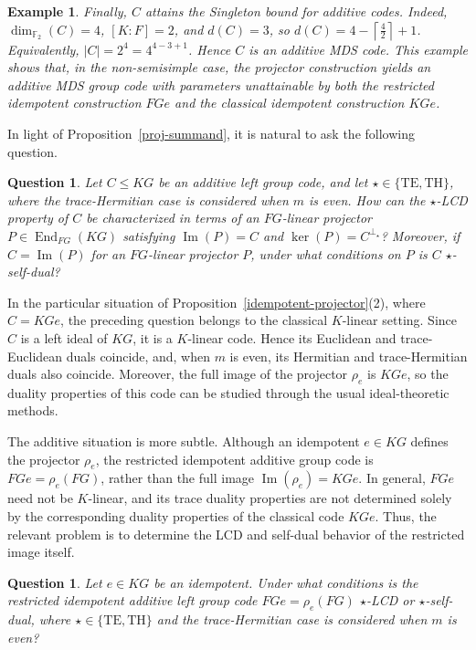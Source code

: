 \documentclass[11pt]{article}
\newtheorem{example}[theorem]{Example}
\newtheorem{question}[theorem]{Question}}
\begin{document}
\begin{example}
Finally, $C$ attains the Singleton bound for additive codes. Indeed,
$\dim_{\mathbb{F}_2}(C)=4$, $[K:F]=2$, and $d(C)=3$, so
$d(C)=4-\left\lceil\frac{4}{2}\right\rceil+1$. Equivalently,
$|C|=2^4=4^{4-3+1}$. Hence $C$ is an additive MDS code. This example shows
that, in the non-semisimple case, the projector construction yields an
additive MDS group code with parameters unattainable by both the restricted
idempotent construction $FGe$ and the classical idempotent construction
$KGe$.
\end{example}



In light of Proposition~\ref{proj-summand}, it is natural to ask the following question.


\begin{question}\label{question-1}
Let $C\leq KG$ be an additive left group code, and let
$\star\in\{\mathrm{TE},\mathrm{TH}\}$, where the trace-Hermitian case is
considered when $m$ is even. How can the $\star$-LCD property of $C$ be
characterized in terms of an $FG$-linear projector
$P\in\operatorname{End}_{FG}(KG)$ satisfying
$\operatorname{Im}(P)=C$ and $\ker(P)=C^{\perp_\star}$? Moreover, if
$C=\operatorname{Im}(P)$ for an $FG$-linear projector $P$, under what
conditions on $P$ is $C$ $\star$-self-dual?
\end{question}


In the particular situation of
Proposition~\ref{idempotent-projector}(2), where $C=KGe$, the preceding
question belongs to the classical $K$-linear setting. Since $C$ is a left
ideal of $KG$, it is a $K$-linear code. Hence its Euclidean and
trace-Euclidean duals coincide, and, when $m$ is even, its Hermitian and
trace-Hermitian duals also coincide. Moreover, the full image of the
projector $\rho_e$ is $KGe$, so the duality properties of this code can be
studied through the usual ideal-theoretic methods.

The additive situation is more subtle. Although an idempotent $e\in KG$
defines the projector $\rho_e$, the restricted idempotent additive group code
is $FGe=\rho_e(FG)$, rather than the full image
$\operatorname{Im}(\rho_e)=KGe$. In general, $FGe$ need not be $K$-linear,
and its trace duality properties are not determined solely by the
corresponding duality properties of the classical code $KGe$. Thus, the
relevant problem is to determine the LCD and self-dual behavior of the
restricted image itself.

\begin{question}\label{question-2}
Let $e\in KG$ be an idempotent. Under what conditions is the restricted
idempotent additive left group code $FGe=\rho_e(FG)$ $\star$-LCD or
$\star$-self-dual, where $\star\in\{\mathrm{TE},\mathrm{TH}\}$ and the
trace-Hermitian case is considered when $m$ is even?
\end{question}
\end{document}
